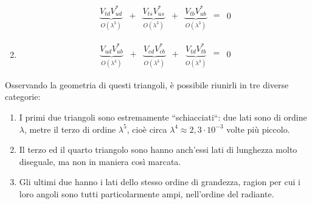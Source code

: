 \begin{enumerate}
\begin{equation}
\begin{matrix} \underbrace{V_{td}V_{ud}^*}_{O(\lambda^3)} \end{matrix} \begin{matrix} {+}\\{ } \end{matrix} \begin{matrix} \underbrace{V_{ts}V_{us}^*}_{O(\lambda^3)} \end{matrix} \begin{matrix} {+}\\{ } \end{matrix} \begin{matrix} \underbrace{V_{tb}V_{ub}^*}_{O(\lambda^3)} \end{matrix} \begin{matrix} {=}\\{ } \end{matrix} \begin{matrix} {0}\\{ } \end{matrix}
 \end{equation}
 \item \begin{equation}
\begin{matrix} \underbrace{V_{ud}V_{ub}^*}_{O(\lambda^3)} \end{matrix} \begin{matrix} {+}\\{ } \end{matrix} \begin{matrix} \underbrace{V_{cd}V_{cb}^*}_{O(\lambda^3)} \end{matrix} \begin{matrix} {+}\\{ } \end{matrix} \begin{matrix} \underbrace{V_{td}V_{tb}^*}_{O(\lambda^3)} \end{matrix} \begin{matrix} {=}\\{ } \end{matrix} \begin{matrix} {0}\\{ } \end{matrix}
 \end{equation}
\end{enumerate}
Osservando la geometria di questi triangoli, è possibile riunirli in tre diverse categorie:
\begin{enumerate}
 \item I primi due triangoli sono estremamente ``schiacciati``: due lati sono di ordine $\lambda$, metre il terzo di ordine $\lambda^5$, cioè circa $\lambda^4 \approx 2,3 \cdot 10^{-3}$
volte più piccolo. 
 \item Il terzo ed il quarto triangolo sono hanno anch'essi lati di lunghezza molto diseguale, ma non in maniera così marcata.
 \item Gli ultimi due hanno i lati dello stesso ordine di grandezza, ragion per cui i loro angoli sono tutti particolarmente ampi, nell'ordine del radiante.
\end{enumerate}

